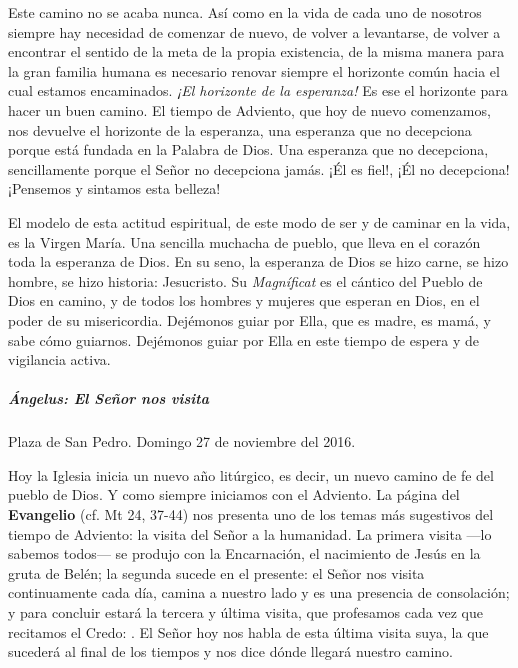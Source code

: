 \documentclass[]{article}
\let\oldsubparagraph\subparagraph
\renewcommand{\subparagraph}[1]{\oldsubparagraph{#1}\mbox{}}
\begin{document}
Este camino no se acaba nunca. Así como en la vida de cada uno de nosotros siempre hay necesidad de comenzar de nuevo, de volver a levantarse, de volver a encontrar el sentido de la meta de la propia existencia, de la misma manera para la gran familia humana es necesario renovar siempre el horizonte común hacia el cual estamos encaminados. \emph{¡El horizonte de la esperanza!} Es ese el horizonte para hacer un buen camino. El tiempo de Adviento, que hoy de nuevo comenzamos, nos devuelve el horizonte de la esperanza, una esperanza que no decepciona porque está fundada en la Palabra de Dios. Una esperanza que no decepciona, sencillamente porque el Señor no decepciona jamás. ¡Él es fiel!, ¡Él no decepciona! ¡Pensemos y sintamos esta belleza!

El modelo de esta actitud espiritual, de este modo de ser y de caminar en la vida, es la Virgen María. Una sencilla muchacha de pueblo, que lleva en el corazón toda la esperanza de Dios. En su seno, la esperanza de Dios se hizo carne, se hizo hombre, se hizo historia: Jesucristo. Su \emph{Magníficat} es el cántico del Pueblo de Dios en camino, y de todos los hombres y mujeres que esperan en Dios, en el poder de su misericordia. Dejémonos guiar por Ella, que es madre, es mamá, y sabe cómo guiarnos. Dejémonos guiar por Ella en este tiempo de espera y de vigilancia activa.

\subparagraph{Ángelus: El Señor nos 	visita}\label{uxe1ngelus-el-seuxf1or-nos-visita}

Plaza de San Pedro. Domingo 27 de noviembre del 2016.

Hoy la Iglesia inicia un nuevo año litúrgico, es decir, un nuevo camino de fe del pueblo de Dios. Y como siempre iniciamos con el Adviento. La página del \textbf{Evangelio} (cf. Mt 24, 37-44) nos presenta uno de los temas más sugestivos del tiempo de Adviento: la visita del Señor a la humanidad. La primera visita ---lo sabemos todos--- se produjo con la Encarnación, el nacimiento de Jesús en la gruta de Belén; la segunda sucede en el presente: el Señor nos visita continuamente cada día, camina a nuestro lado y es una presencia de consolación; y para concluir estará la tercera y última visita, que profesamos cada vez que recitamos el Credo: . El Señor hoy nos habla de esta última visita suya, la que sucederá al final de los tiempos y nos dice dónde llegará nuestro camino.
\end{document}
